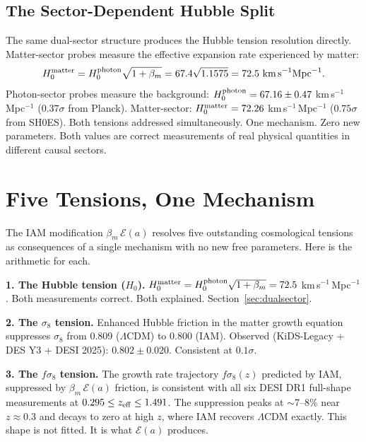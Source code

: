 \documentclass[12pt,a4paper]{article}
\begin{document}
\subsection{The Sector-Dependent Hubble Split}

The same dual-sector structure produces the Hubble tension resolution directly.
Matter-sector probes measure the effective expansion rate experienced by matter:
\begin{equation}
H_0^{\rm matter} = H_0^{\rm photon}\sqrt{1+\beta_m}
= 67.4\sqrt{1.1575} = 72.5~\text{km\,s}^{-1}\text{Mpc}^{-1}.
\end{equation}
Photon-sector probes measure the background:
$H_0^{\rm photon} = 67.16 \pm 0.47$ km\,s$^{-1}$\,Mpc$^{-1}$
($0.37\sigma$ from Planck). Matter-sector:
$H_0^{\rm matter} = 72.26$ km\,s$^{-1}$\,Mpc$^{-1}$
($0.75\sigma$ from SH0ES). Both tensions addressed simultaneously.
One mechanism. Zero new parameters. Both values are correct measurements
of real physical quantities in different causal sectors.

\newpage

\section{Five Tensions, One Mechanism}
\label{sec:tensions}

The IAM modification $\beta_m\,\mathcal{E}(a)$ resolves five outstanding
cosmological tensions as consequences of a single mechanism with no new
free parameters. Here is the arithmetic for each.

\textbf{1. The Hubble tension ($H_0$).}
$H_0^{\rm matter} = H_0^{\rm photon}\sqrt{1+\beta_m} = 72.5$ km\,s$^{-1}$\,Mpc$^{-1}$.
Both measurements correct. Both explained. Section~\ref{sec:dualsector}.

\textbf{2. The $\sigma_8$ tension.}
Enhanced Hubble friction in the matter growth equation suppresses $\sigma_8$
from 0.809 ($\Lambda$CDM) to 0.800 (IAM). Observed (KiDS-Legacy + DES Y3 +
DESI 2025): $0.802 \pm 0.020$. Consistent at $0.1\sigma$.

\textbf{3. The $f\sigma_8$ tension.}
The growth rate trajectory $f\sigma_8(z)$ predicted by IAM, suppressed by
$\beta_m\,\mathcal{E}(a)$ friction, is consistent with all six DESI DR1
full-shape measurements at $0.295 \leq z_{\rm eff} \leq 1.491$.
The suppression peaks at $\sim$7--8\% near $z \approx 0.3$ and decays to zero
at high $z$, where IAM recovers $\Lambda$CDM exactly. This shape is not fitted.
It is what $\mathcal{E}(a)$ produces.
\end{document}
